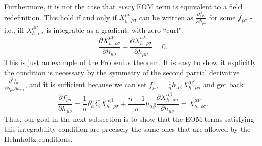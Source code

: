 \documentclass[aps,physrev,preprint,groupedaddress]{revtex4-2}
\begin{document}
Furthermore, it is not the case that \textit{every} EOM term is equivalent to a field redefinition. This hold if and only if \(X_h^{\mu\nu}{}_{\rho\sigma}\) can be written as \(\frac{\partial f_{\rho\sigma}}{\partial h_{\mu\nu}}\) for some \(f_{\rho\sigma}\) - i.e., iff \(X_h^{\mu\nu}{}_{\rho\sigma}\) is integrable as a gradient, with zero ``curl": 
\begin{equation}
\frac{\partial X_h^{\mu\nu}{}_{\rho\sigma}}{\partial h_{\kappa\lambda}}-\frac{\partial X_h^{\kappa\lambda}{}_{\rho\sigma}}{\partial h_{\mu\nu}}=0.
\end{equation}
This is just an example of the Frobenius theorem. It is easy to show it explicitly: the condition is necessary by the symmetry of the second partial derivative \(\frac{\partial^2 f_{\rho\sigma}}{\partial h_{\mu\nu}\partial h_{\kappa\lambda}}\), and it is sufficient because we can set \(f_{\rho\sigma}=\frac{1}{n}h_{\alpha\beta}X_h^{\alpha\beta}{}_{\rho\sigma}\) and get back
\begin{equation}
\frac{\partial f_{\rho\sigma}}{\partial h_{\mu\nu}}=\frac{1}{n}\delta^\mu_\alpha\delta^\nu_\beta X_h^{\alpha\beta}{}_{\rho\sigma}+\frac{n-1}{n}h_{\alpha\beta}\frac{\partial X_h^{\alpha\beta}{}_{\rho\sigma}}{\partial h_{\mu\nu}}=X_h^{\mu\nu}{}_{\rho\sigma}.
\end{equation}
Thus, our goal in the next subsection is to show that the EOM terms satisfying this integrability condition are precisely the same ones that are allowed by the Helmholtz conditions.
\end{document}
